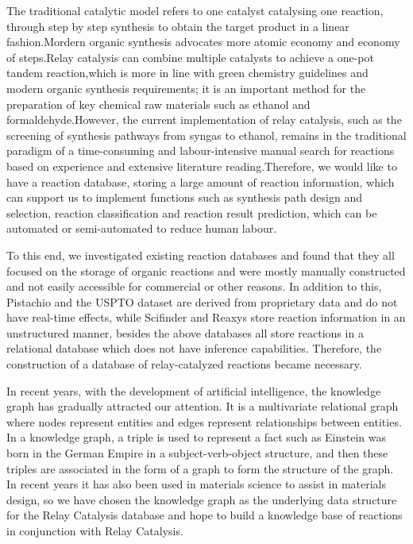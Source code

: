 \documentclass[%
 aip,
 jmp,%
 amsmath,amssymb,
 reprint,%
]{revtex4-2}
\begin{document}
The traditional catalytic model refers to one catalyst catalysing one reaction, through step by step synthesis to obtain the target product
 in a linear fashion.Mordern organic synthesis advocates more atomic economy and economy of steps.Relay catalysis can combine multiple 
 catalysts to achieve a one-pot tandem reaction,which is more in line with green chemistry guidelines and modern organic synthesis 
 requirements; it is an important method for the preparation of key chemical raw materials such as ethanol and formaldehyde.However, the 
 current implementation of relay catalysis, such as the screening of synthesis pathways from syngas to ethanol, remains in the traditional 
 paradigm of a time-consuming and labour-intensive manual search for reactions based on experience and extensive literature reading.Therefore, 
 we would like to have a reaction database, storing a large amount of reaction information, which can support us to implement functions 
 such as synthesis path design and selection, reaction classification and reaction result prediction, which can be automated or 
 semi-automated to reduce human labour.

To this end, we investigated existing reaction databases and found that they all focused on the storage of organic reactions and were mostly manually constructed and not easily accessible for commercial or other reasons.
In addition to this, Pistachio and the USPTO dataset are derived from proprietary data and do not have real-time effects, while Scifinder and Reaxys store reaction information in an unstructured manner, besides the above databases all store reactions in a relational database which does not have inference capabilities.
Therefore, the construction of a database of relay-catalyzed reactions became necessary.


In recent years, with the development of artificial intelligence, the knowledge graph has gradually attracted our attention.
It is a multivariate relational graph where nodes represent entities and edges represent relationships between entities. In a knowledge graph, a triple is used to represent a fact such as Einstein was born in the German Empire in a subject-verb-object structure, and then these triples are associated in the form of a graph to form the structure of the graph. In recent years it has also been used in materials science to assist in materials design, so we have chosen the knowledge graph as the underlying data structure for the Relay Catalysis database and hope to build a knowledge base of reactions in conjunction with Relay Catalysis.
\end{document}
